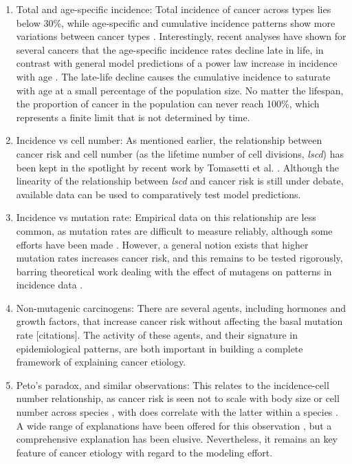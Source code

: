 \documentclass[9pt,onecolumn,twoside]{pnas-new}
\begin{document}
\begin{enumerate}
	\item Total and age-specific incidence: Total incidence of cancer across types lies below 30\%, while age-specific and cumulative incidence patterns show more variations between cancer types \cite{AmericanCancerSociety2016}. Interestingly, recent analyses have shown for several cancers that the age-specific incidence rates decline late in life, in contrast with general model predictions of a power law increase in incidence with age \cite{Harding2012}. The late-life decline causes the cumulative incidence to saturate with age at a small percentage of the population size. No matter the lifespan, the proportion of cancer in the population can never reach 100\%, which represents a finite limit that is not determined by time.
	\item Incidence vs cell number: As mentioned earlier, the relationship between cancer risk and cell number (as the lifetime number of cell divisions, \textit{lscd}) has been kept in the spotlight by recent work by Tomasetti et al. \cite{Tomasetti78, Tomasetti2017}. Although the linearity of the relationship between \textit{lscd} and cancer risk is still under debate, available data can be used to comparatively test model predictions.
	\item Incidence vs mutation rate: Empirical data on this relationship are less common, as mutation rates are difficult to measure reliably, although some efforts have been made \cite{Hao2016}. However, a general notion exists that higher mutation rates increases cancer risk, and this remains to be tested rigorously, barring theoretical work dealing with the effect of mutagens on patterns in incidence data \cite{Frank2007}.
	\item Non-mutagenic carcinogens: There are several agents, including hormones and growth factors, that increase cancer risk without affecting the basal mutation rate [citations]. The activity of these agents, and their signature in epidemiological patterns, are both important in building a complete framework of explaining cancer etiology.
	\item Peto's paradox, and similar observations: This relates to the incidence-cell number relationship, as cancer risk is seen not to scale with body size or cell number across species \cite{Nagy2007}, with does correlate with the latter within a species \cite{Noble2015}. A wide range of explanations have been offered for this observation \cite{Tollis2017b}, but a comprehensive explanation has been elusive. Nevertheless, it remains an key feature of cancer etiology with regard to the modeling effort.
\end{enumerate}
\end{document}
